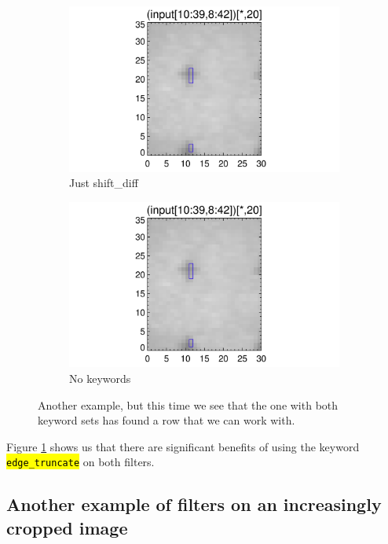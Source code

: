 \documentclass[10pt]{article}
\begin{document}
\begin{figure}[!h]
   \begin{subfigure}[b]{.45\linewidth}
        \centering
        \includegraphics[width=1.3\textwidth]{plots_tables_images/fidcheck_withshiftdifftruncate1.png}
        \caption{Just shift\_diff}
    \end{subfigure}
    \begin{subfigure}[b]{.45\linewidth}
        \centering
        \includegraphics[width=1.3\textwidth]{plots_tables_images/fidcheck_withnotruncate1.png}
        \caption{No keywords}
    \end{subfigure}
    \caption{Another example, but this time we see that the one with both keyword sets has found a row that we can work with.}
    \label{whystopnow}
\end{figure}

Figure \ref{whystopnow} shows us that there are significant benefits of using the keyword \hl{\texttt{edge\_truncate}} on both filters.

\subsection{Another example of filters on an increasingly cropped image} %
\label{sub:another_example_of_filters_on_an_increasingly_cropped_image}
\end{document}
